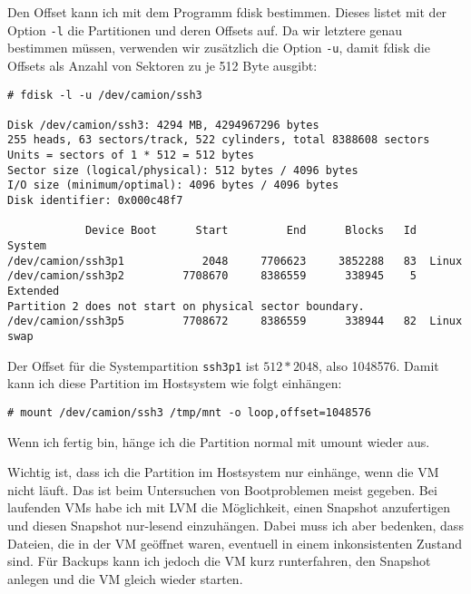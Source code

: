 Den Offset kann ich mit dem Programm fdisk bestimmen. Dieses listet mit der
Option \verb?-l? die Partitionen und deren Offsets auf. Da wir letztere genau
bestimmen müssen, verwenden wir zusätzlich die Option \verb?-u?, damit fdisk
die Offsets als Anzahl von Sektoren zu je 512 Byte ausgibt:

\begin{verbatim}
# fdisk -l -u /dev/camion/ssh3 

Disk /dev/camion/ssh3: 4294 MB, 4294967296 bytes
255 heads, 63 sectors/track, 522 cylinders, total 8388608 sectors
Units = sectors of 1 * 512 = 512 bytes
Sector size (logical/physical): 512 bytes / 4096 bytes
I/O size (minimum/optimal): 4096 bytes / 4096 bytes
Disk identifier: 0x000c48f7

            Device Boot      Start         End      Blocks   Id  System
/dev/camion/ssh3p1            2048     7706623     3852288   83  Linux
/dev/camion/ssh3p2         7708670     8386559      338945    5  Extended
Partition 2 does not start on physical sector boundary.
/dev/camion/ssh3p5         7708672     8386559      338944   82  Linux swap
\end{verbatim}

Der Offset für die Systempartition \verb?ssh3p1? ist $512 * 2048$, also
1048576. Damit kann ich diese Partition im Hostsystem wie folgt einhängen:

\begin{verbatim}
# mount /dev/camion/ssh3 /tmp/mnt -o loop,offset=1048576
\end{verbatim}

Wenn ich fertig bin, hänge ich die Partition normal mit umount wieder aus.

Wichtig ist, dass ich die Partition im Hostsystem nur einhänge, wenn die VM
nicht läuft. Das ist beim Untersuchen von Bootproblemen meist gegeben. Bei
laufenden VMs habe ich mit LVM die Möglichkeit, einen Snapshot anzufertigen
und diesen Snapshot nur-lesend einzuhängen. Dabei muss ich aber bedenken, dass
Dateien, die in der VM geöffnet waren, eventuell in einem inkonsistenten
Zustand sind. Für Backups kann ich jedoch die VM kurz runterfahren, den
Snapshot anlegen und die VM gleich wieder starten.


